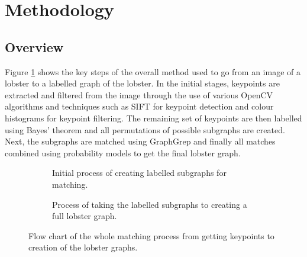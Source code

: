 \section{Methodology}\label{sec:design}
\renewcommand{\imgpath}{tex/design/imgs}
\vspace{1cm}

\subsection{Overview}
Figure \ref{fig:overview} shows the key steps of the overall method used to go from an image of a lobster to a labelled graph of the lobster. In the initial stages, keypoints are extracted and filtered from the image through the use of various OpenCV algorithms and techniques such as SIFT for keypoint detection and colour histograms for keypoint filtering. The remaining set of keypoints are then labelled using Bayes' theorem and all permutations of possible subgraphs are created. Next, the subgraphs are matched using GraphGrep \cite{graphgrep} and finally all matches combined using probability models to get the final lobster graph. 
\begin{figure}[H]
\centering
\begin{subfigure}{\textwidth}
\centering
{}
\caption{Initial process of creating labelled subgraphs for matching.}
\vspace{0.7cm}
\end{subfigure}

\begin{subfigure}{\textwidth}
\centering
{}
\caption{Process of taking the labelled subgraphs to creating a full lobster graph.}
\end{subfigure}
\caption{Flow chart of the whole matching process from getting keypoints to creation of the lobster graphs.}
\label{fig:overview}
\end{figure}
